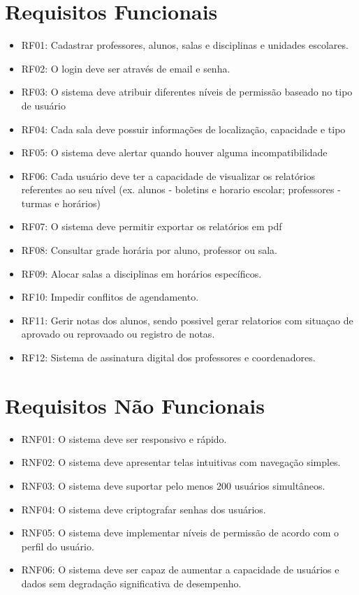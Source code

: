 \documentclass[12pt,a4paper]{report}
\begin{document}
\section{Requisitos Funcionais}
	\begin{itemize}
    \item RF01: Cadastrar professores, alunos, salas e disciplinas e unidades escolares.
    \item RF02: O login deve ser através de email e senha.
    \item RF03: O sistema deve atribuir diferentes níveis de permissão baseado no tipo de usuário
    \item RF04: Cada sala deve possuir informações de localização, capacidade e tipo
    \item RF05: O sistema deve alertar quando houver alguma incompatibilidade
    \item RF06: Cada usuário deve ter a capacidade de visualizar os relatórios referentes ao seu nível (ex. alunos - boletins e horario escolar; professores - turmas e horários)
    \item RF07: O sistema deve permitir exportar os relatórios em pdf
    \item RF08: Consultar grade horária por aluno, professor ou sala.
    \item RF09: Alocar salas a disciplinas em horários específicos.
    \item RF10: Impedir conflitos de agendamento.
    \item RF11: Gerir notas dos alunos, sendo possivel gerar relatorios com situaçao de aprovado ou reprovaado ou registro de notas.
    \item RF12: Sistema de assinatura digital dos professores e coordenadores.
	\end{itemize}

\section{Requisitos Não Funcionais}
	\begin{itemize}
    \item RNF01: O sistema deve ser responsivo e rápido.
    \item RNF02: O sistema deve apresentar telas intuitivas com navegação simples.
    \item RNF03: O sistema deve suportar pelo menos 200 usuários simultâneos.
    \item RNF04: O sistema deve criptografar senhas dos usuários.
    \item RNF05: O sistema deve implementar níveis de permissão de acordo com o perfil do usuário.
    \item RNF06: O sistema deve ser capaz de aumentar a capacidade de usuários e dados sem degradação significativa de desempenho.
    
	\end{itemize}
\end{document}
